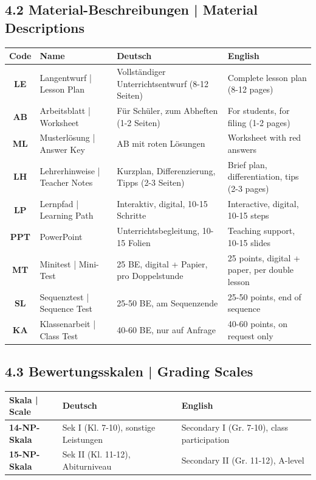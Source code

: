 \documentclass[11pt,a4paper]{article}
\begin{document}
\subsection*{4.2 Material-Beschreibungen | Material Descriptions}

\begin{tabularx}{\textwidth}{|c|l|X|X|}
\hline
\rowcolor{lightgray}
\textbf{Code} & \textbf{Name} & \textbf{Deutsch} & \textbf{English} \\
\hline
\textbf{LE} & Langentwurf | Lesson Plan &
Vollständiger Unterrichtsentwurf (8-12 Seiten) &
Complete lesson plan (8-12 pages) \\
\hline
\textbf{AB} & Arbeitsblatt | Worksheet &
Für Schüler, zum Abheften (1-2 Seiten) &
For students, for filing (1-2 pages) \\
\hline
\textbf{ML} & Musterlösung | Answer Key &
AB mit roten Lösungen &
Worksheet with red answers \\
\hline
\textbf{LH} & Lehrerhinweise | Teacher Notes &
Kurzplan, Differenzierung, Tipps (2-3 Seiten) &
Brief plan, differentiation, tips (2-3 pages) \\
\hline
\textbf{LP} & Lernpfad | Learning Path &
Interaktiv, digital, 10-15 Schritte &
Interactive, digital, 10-15 steps \\
\hline
\textbf{PPT} & PowerPoint &
Unterrichtsbegleitung, 10-15 Folien &
Teaching support, 10-15 slides \\
\hline
\textbf{MT} & Minitest | Mini-Test &
25 BE, digital + Papier, pro Doppelstunde &
25 points, digital + paper, per double lesson \\
\hline
\textbf{SL} & Sequenztest | Sequence Test &
25-50 BE, am Sequenzende &
25-50 points, end of sequence \\
\hline
\textbf{KA} & Klassenarbeit | Class Test &
40-60 BE, nur auf Anfrage &
40-60 points, on request only \\
\hline
\end{tabularx}

\subsection*{4.3 Bewertungsskalen | Grading Scales}

\begin{tabularx}{\textwidth}{|l|X|X|}
\hline
\rowcolor{lightgray}
\textbf{Skala | Scale} & \textbf{Deutsch} & \textbf{English} \\
\hline
\textbf{14-NP-Skala} &
Sek I (Kl. 7-10), sonstige Leistungen &
Secondary I (Gr. 7-10), class participation \\
\hline
\textbf{15-NP-Skala} &
Sek II (Kl. 11-12), Abiturniveau &
Secondary II (Gr. 11-12), A-level \\
\hline
\end{tabularx}
\end{document}
